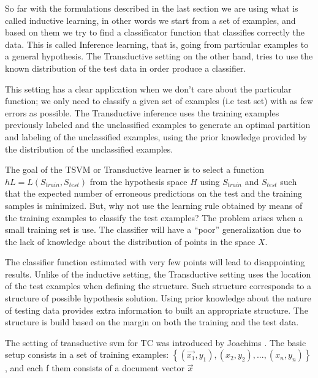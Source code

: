 So far with the formulations described in the last section we are
using what is called inductive learning, in other words we start from
a set of examples, and based on them we try to find a classificator
function that classifies correctly the data. This is called Inference
learning, that is, going from particular examples to a general hypothesis.
The Transductive setting on the other hand, tries to use the known
distribution of the test data in order produce a classifier. 

This setting has a clear application when we don\textquoteright{}t
care about the particular function; we only need to classify a given
set of examples (i.e test set) with as few errors as possible. The
Transductive inference uses the training examples previously labeled
and the unclassified examples to generate an optimal partition and
labeling of the unclassified examples, using the prior knowledge provided
by the distribution of the unclassified examples.

The goal of the TSVM or Transductive learner is to select a function
$hL=L(S_{train},S_{test})$ from the hypothesis space $H$ using $S_{train}$
and $S_{test}$ such that the expected number of erroneous predictions
on the test and the training samples is minimized. But, why not use
the learning rule obtained by means of the training examples to classify
the test examples? The problem arises when a small training set is
use. The classifier will have a \textquotedblleft{}poor\textquotedblright{}
generalization due to the lack of knowledge about the distribution
of points in the space $X$. 

The classifier function estimated with very few points will lead to
disappointing results. Unlike of the inductive setting, the Transductive
setting uses the location of the test examples when defining the structure.
Such structure corresponds to a structure of possible hypothesis solution.
Using prior knowledge about the nature of testing data provides extra
information to built an appropriate structure. The structure is build
based on the margin on both the training and the test data.

The setting of transductive svm for TC was introduced by Joachims
\cite{Joachims99c}. The basic setup consists in a set of training examples: $\left\{
(\overrightarrow{x_{1}},y_{1}),(x_{2},y_{2}),...,(x_{n},y_{n})\right\}$, and each f them
consists of a document vector $\overrightarrow{x}$ 


